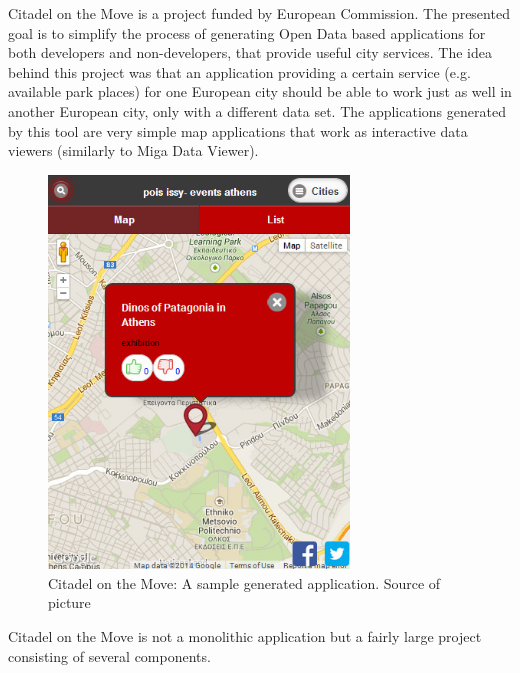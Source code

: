 Citadel on the Move \cite{citadel_home} is a project \cite{citadel_paper} funded by European Commission. The presented goal is to simplify the process of generating Open Data based applications for both developers and non-developers, that provide useful city services. The idea behind this project was that an application providing a certain service (e.g. available park places) for one European city should be able to work just as well in another European city, only with a different data set. The applications generated by this tool are very simple map applications that work as interactive data viewers (similarly to Miga Data Viewer).
%
%
%

\begin{figure}
	\centering
	\includegraphics[width=80mm]{img/02_citadel_on_the_move_app.jpg}
	\caption{Citadel on the Move: A sample generated application. Source of picture \cite{citadel_agt_doc}}
	\label{fig:citadel-on-the-move}
\end{figure}

Citadel on the Move is not a monolithic application but a fairly large project consisting of several components.

